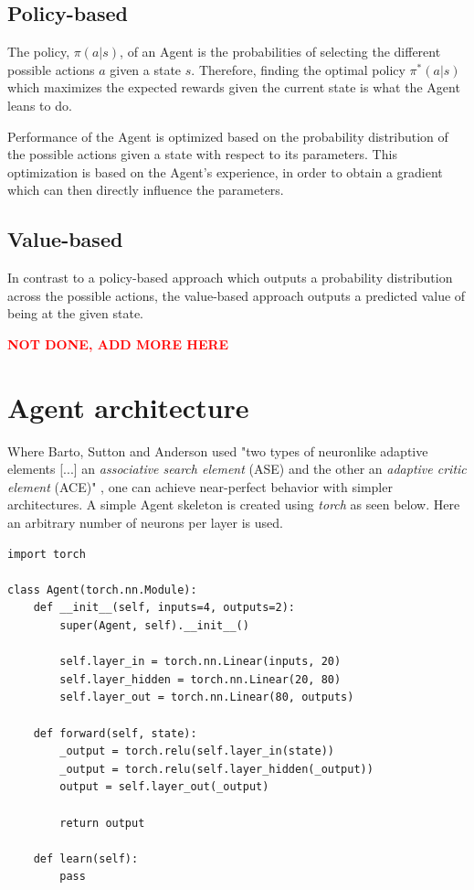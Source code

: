 \documentclass{article}
\renewenvironment{leftbar}[1][\hsize]{
    \def\FrameCommand{{\color{barcolor}\vrule width 2pt \hspace{10pt}}}
    \MakeFramed{\hsize#1 \advance\hsize-\width \FrameRestore}
}{\endMakeFramed}
\begin{document}
\subsection*{Policy-based}
\begin{leftbar}
    The policy, $\pi(a|s)$, of an Agent is the probabilities of selecting the different possible actions $a$ given a state $s$. Therefore, finding the optimal policy $\pi^*(a|s)$ which maximizes the expected rewards given the current state is what the Agent leans to do. \cite{HF-approaches}

    Performance of the Agent is optimized based on the probability distribution of the possible actions given a state with respect to its parameters. This optimization is based on the Agent's experience, in order to obtain a gradient which can then directly influence the parameters. \cite{HF-policy}
\end{leftbar}
\subsection*{Value-based}
\begin{leftbar}
    In contrast to a policy-based approach which outputs a probability distribution across the possible actions, the value-based approach outputs a predicted value of being at the given state. \cite{HF-value}

    \textbf{\textcolor{red}{NOT DONE, ADD MORE HERE}}
\end{leftbar}

\section*{Agent architecture}

Where Barto, Sutton and Anderson used "two types of neuronlike adaptive elements [...] an \textit{associative search element} (ASE) and the other an \textit{adaptive critic element} (ACE)" \cite{Neuronlike}, one can achieve near-perfect behavior with simpler architectures. A simple Agent skeleton is created using \textit{torch} as seen below. Here an arbitrary number of neurons per layer is used.

\begin{lstlisting}
import torch

class Agent(torch.nn.Module):
    def __init__(self, inputs=4, outputs=2):
        super(Agent, self).__init__()

        self.layer_in = torch.nn.Linear(inputs, 20)
        self.layer_hidden = torch.nn.Linear(20, 80)
        self.layer_out = torch.nn.Linear(80, outputs)

    def forward(self, state):
        _output = torch.relu(self.layer_in(state))
        _output = torch.relu(self.layer_hidden(_output))
        output = self.layer_out(_output)
        
        return output

    def learn(self):
        pass
\end{lstlisting}
\end{document}
